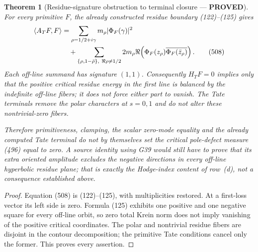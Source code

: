 \documentclass[11pt]{article}
\newtheorem{theorem}{Theorem}
\newcommand{\PROVED}{\textcolor{green!45!black}{\textbf{PROVED}}}
\begin{document}
\begin{theorem}[Residue-signature obstruction to terminal closure ---
\PROVED]
For every primitive \(F\), the already constructed residue boundary
(122)--(125) gives
\begin{align}
 \langle A_TF,F\rangle
 &=\sum_{\rho=1/2+i\gamma}m_\rho|\Phi_F(\gamma)|^2\notag\\
 &\quad+\sum_{\{\rho,1-\bar\rho\},\ \Re\rho\ne1/2}
 2m_\rho\Re\!\left(
   \Phi_F(z_\rho)\overline{\Phi_F(\bar z_\rho)}\right).         \tag{508}
\end{align}
Each off-line summand has signature \((1,1)\).  Consequently
\(H_TF=0\) implies only that the positive critical residue energy in the
first line is balanced by the indefinite off-line fibers; it does not force
either part to vanish.  The Tate terminals remove the polar characters at
\(s=0,1\) and do not alter these nontrivial-zero fibers.

Therefore primitiveness, clamping, the scalar zero-mode equality and the
already computed Tate terminal do not by themselves set the critical
pole-defect measure (496) equal to zero.  A source identity using G39 would
still have to prove that its extra oriented amplitude excludes the negative
directions in every off-line hyperbolic residue plane; that is exactly the
Hodge-index content of row~(d), not a consequence established above.
\end{theorem}

\begin{proof}
Equation (508) is (122)--(125), with multiplicities restored.  At a
first-loss vector its left side is zero.  Formula (125) exhibits one positive
and one negative square for every off-line orbit, so zero total Krein norm
does not imply vanishing of the positive critical coordinates.  The polar
and nontrivial residue fibers are disjoint in the contour decomposition;
the primitive Tate conditions cancel only the former.  This proves every
assertion.
\end{proof}
\end{document}
